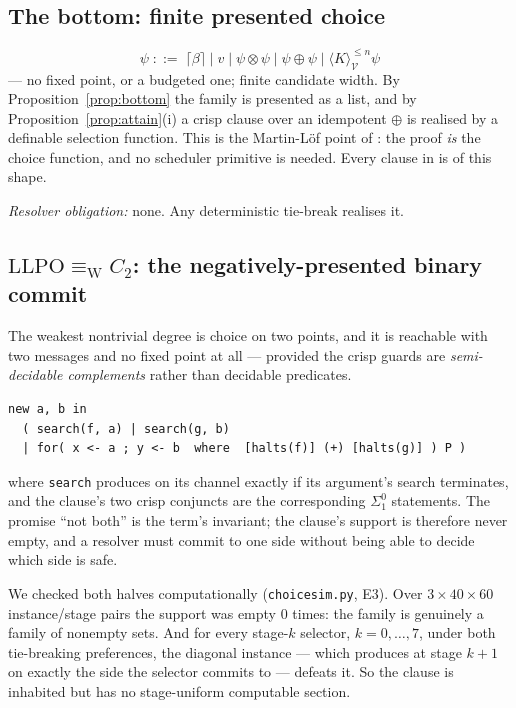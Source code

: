 \documentclass[11pt]{article}
\theoremstyle{definition}
\theoremstyle{plain}
\theoremstyle{remark}
\newcommand{\V}{\mathcal{V}}
\newcommand{\sumv}{\oplus}
\newcommand{\tensorv}{\otimes}
\newcommand{\crisp}[1]{\lceil #1 \rceil}
\newcommand{\LLPO}{\mathrm{LLPO}}
\newcommand{\ew}{\equiv_{\mathrm{W}}}
\begin{document}
\subsection{The bottom: finite presented choice}\label{ssec:finite}

\[
  \psi \;::=\; \crisp{\beta} \mid v \mid \psi \tensorv \psi \mid \psi \sumv \psi
  \mid \langle K \rangle_\V^{\leq n} \psi
\]
--- no fixed point, or a budgeted one; finite candidate width. By
Proposition~\ref{prop:bottom} the family is presented as a list, and by
Proposition~\ref{prop:attain}(i) a crisp clause over an idempotent $\sumv$ is realised
by a definable selection function. This is the Martin-L\"of point of
\cite{choicesched}: the proof \emph{is} the choice function, and no scheduler
primitive is needed. Every clause in \cite{gradedwhere} is of this shape.

\emph{Resolver obligation:} none. Any deterministic tie-break realises it.

\subsection{$\LLPO \ew C_2$: the negatively-presented binary commit}\label{ssec:llpo}

The weakest nontrivial degree is choice on two points, and it is reachable with two
messages and no fixed point at all --- provided the crisp guards are
\emph{semi-decidable complements} rather than decidable predicates.

\begin{lstlisting}
new a, b in
  ( search(f, a) | search(g, b)
  | for( x <- a ; y <- b  where  [halts(f)] (+) [halts(g)] ) P )
\end{lstlisting}

\noindent
where \texttt{search} produces on its channel exactly if its argument's search
terminates, and the clause's two crisp conjuncts are the corresponding
$\Sigma^0_1$ statements. The promise ``not both'' is the term's invariant; the clause's
support is therefore never empty, and a resolver must commit to one side without being
able to decide which side is safe.

We checked both halves computationally (\texttt{choicesim.py}, E3). Over
$3 \times 40 \times 60$ instance/stage pairs the support was empty $0$ times: the
family is genuinely a family of nonempty sets. And for every stage-$k$ selector,
$k = 0,\dots,7$, under both tie-breaking preferences, the diagonal instance --- which
produces at stage $k+1$ on exactly the side the selector commits to --- defeats it.
So the clause is inhabited but has no stage-uniform computable section.
\end{document}
